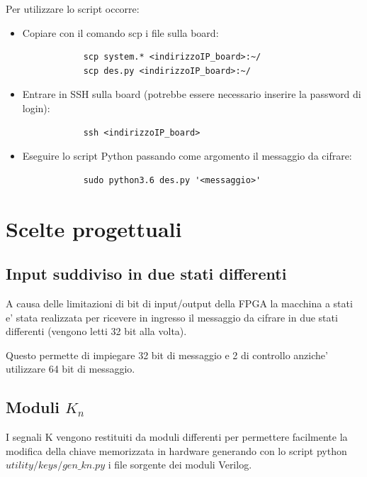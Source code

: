 \documentclass[a4paper]{article}
\begin{document}
Per utilizzare lo script occorre:
\begin{itemize}
    \item Copiare con il comando scp i file sulla board:

          \begin{verbatim}
            scp system.* <indirizzoIP_board>:~/
            scp des.py <indirizzoIP_board>:~/
          \end{verbatim}
    \item Entrare in SSH sulla board (potrebbe essere necessario inserire la password di login):

          \begin{verbatim}
            ssh <indirizzoIP_board>
          \end{verbatim}
    \item Eseguire lo script Python passando come argomento il messaggio da cifrare:
          \begin{verbatim}
            sudo python3.6 des.py '<messaggio>'
          \end{verbatim}
\end{itemize}

\section{Scelte progettuali}

\subsection{Input suddiviso in due stati differenti}
A causa delle limitazioni di bit di input/output della FPGA la macchina a stati e' stata realizzata per ricevere in ingresso il messaggio da cifrare in due stati differenti (vengono letti 32 bit alla volta).

Questo permette di impiegare 32 bit di messaggio e 2 di controllo anziche' utilizzare 64 bit di messaggio.

\subsection{Moduli $K_n$}
I segnali K vengono restituiti da moduli differenti per permettere 
facilmente la modifica della chiave memorizzata in hardware
generando con lo script python $utility/keys/gen\_kn.py$ i file 
sorgente dei moduli Verilog.
\end{document}
